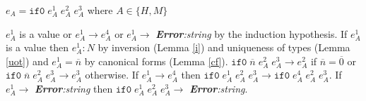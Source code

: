 \begin{case}
$e_{A}=\mathtt{if0}\;e_{A}^{1}\;e_{A}^{2}\;e_{A}^{3}$ where $A\in\lbrace H,M\rbrace$

$e_{A}^{1}$ is a value or $e_{A}^{1}\rightarrow e_{A}^{4}$ or $e_{A}^{1}\rightarrow$ \emph{\textbf{Error}:\;string} by the induction hypothesis.  If $e_{A}^{1}$ is a value then $e_{A}^{1}:N$ by inversion (Lemma \ref{i}) and uniqueness of types (Lemma \ref{uot}) and $e_{A}^{1}=\overline{n}$ by canonical forms (Lemma \ref{cf}).  $\mathtt{if0}\;\overline{n}\;e_{A}^{2}\;e_{A}^{3}\rightarrow e_{A}^{2}$ if $\overline{n}=\overline{0}$ or $\mathtt{if0}\;\overline{n}\;e_{A}^{2}\;e_{A}^{3}\rightarrow e_{A}^{3}$ otherwise.  If $e_{A}^{1}\rightarrow e_{A}^{4}$ then $\mathtt{if0}\;e_{A}^{1}\;e_{A}^{2}\;e_{A}^{3}\rightarrow \mathtt{if0}\;e_{A}^{4}\;e_{A}^{2}\;e_{A}^{3}$.  If $e_{A}^{1}\rightarrow$ \emph{\textbf{Error}:\;string} then $\mathtt{if0}\;e_{A}^{1}\;e_{A}^{2}\;e_{A}^{3}\rightarrow$ \emph{\textbf{Error}:\;string}.
\end{case}